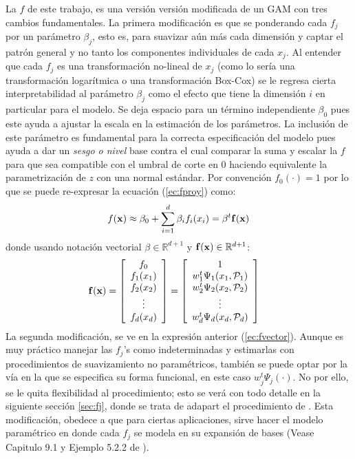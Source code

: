 \documentclass[../Main/Main.tex]{subfiles}
\begin{document}
La $f$ de este trabajo, es una versión versión modificada de un GAM con tres cambios fundamentales. La primera modificación es que se ponderando cada $f_j$ por un parámetro $\beta_j$, esto es, para suavizar aún más cada dimensión y captar el patrón general y no tanto los componentes individuales de cada $x_j$. Al entender que cada $f_j$ es una transformación no-lineal de $x_j$ (como lo sería una transformación logarítmica o una transformación Box-Cox) se le regresa cierta interpretabilidad al parámetro $\beta_j$ como el efecto que tiene la dimensión $i$ en particular para el modelo. Se deja espacio para un término independiente $\beta_0$ pues este ayuda a ajustar la escala en la estimación de los parámetros. La inclusión de este parámetro es fundamental para la correcta especificación del modelo pues ayuda a dar un \textit{sesgo o nivel} base contra el cual comparar la suma y escalar la $f$ para que sea compatible con el umbral de corte en $0$ haciendo equivalente la parametrización de $z$ con una normal estándar. Por convención $f_0(\cdot) = 1$ por lo que se puede re-expresar la ecuación (\ref{ec:fproy}) como:
$$
f(\mathbf{x}) \approx \beta_0 +\sum_{i=1}^d \beta_i f_i(x_i) = \beta^t \mathbf{f}(\mathbf{x})
$$
donde usando notación vectorial $\beta\in\mathbb{R}^{d+1}$ y 
$\mathbf{f}(\mathbf{x}) \in\mathbb{R}^{d+1}$:
\begin{align}
\mathbf{f}(\mathbf{x}) &=  
\left[
	\begin{array}{c} 
	f_0 \\
	f_1(x_1) \\
	f_2(x_2) \\
	\vdots   \\
	f_d(x_d)
	\end{array}
\right]
	=
\left[
	\begin{array}{c} 
	1 \\
 	w_1^t\Psi_1(x_1,\mathcal{P}_1)\\
 	w_2^t\Psi_2(x_2,\mathcal{P}_2)\\
	\vdots   \\
 	w_d^t\Psi_d(x_d,\mathcal{P}_d)\\
	\end{array}
\right]	\label{ec:fvector}
\end{align} 
La segunda modificación, se ve en la expresión anterior (\ref{ec:fvector}). Aunque es muy práctico manejar las $f_j$'s como indeterminadas y estimarlas con procedimientos de suavizamiento no paramétricos, también se puede optar por la vía en la que se especifica su forma funcional, en este caso $w_j^t\Psi_j(\cdot)$.
No por ello, se le quita flexibilidad al procedimiento; esto se verá con todo detalle en la siguiente sección \ref{sec:fj}, donde se trata de adapart el procedimiento de \autocite{mallik1998automatic}. Esta modificación, obedece a que para ciertas aplicaciones, sirve hacer el modelo paramétrico en donde cada $f_j$ se modela en su expansión de bases (Vease Capitulo 9.1 y Ejemplo 5.2.2 de \autocite{hastie2008elements}).\\
\end{document}
